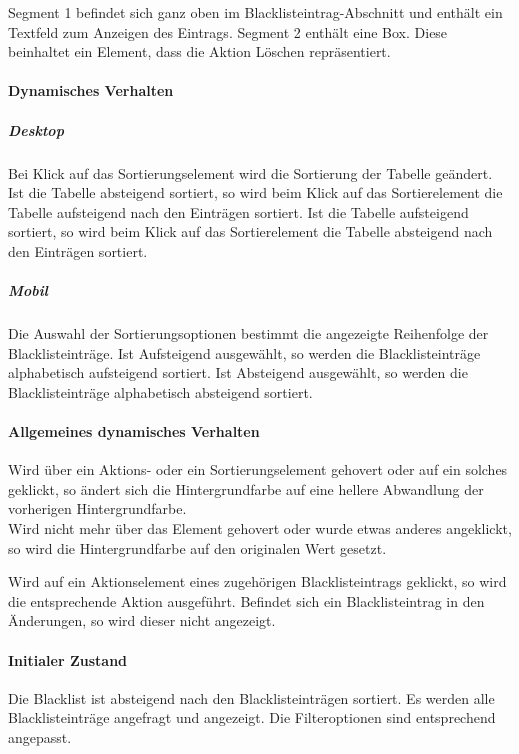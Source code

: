 Segment 1 befindet sich ganz oben im Blacklisteintrag-Abschnitt und enthält ein Textfeld zum Anzeigen des Eintrags.
Segment 2 enthält eine Box. Diese beinhaltet ein Element, dass die Aktion \dq Löschen \dq{} repräsentiert.

\paragraph*{Dynamisches Verhalten}
\subparagraph*{Desktop}
Bei Klick auf das Sortierungselement wird die Sortierung der Tabelle geändert.
Ist die Tabelle absteigend sortiert, so wird beim Klick auf das Sortierelement die Tabelle aufsteigend nach den Einträgen sortiert.
Ist die Tabelle aufsteigend sortiert, so wird beim Klick auf das Sortierelement die Tabelle absteigend nach den Einträgen sortiert.

\subparagraph*{Mobil}
Die Auswahl der Sortierungsoptionen bestimmt die angezeigte Reihenfolge der Blacklisteinträge.
Ist \dq Aufsteigend \dq{} ausgewählt, so werden die Blacklisteinträge alphabetisch aufsteigend sortiert.
Ist \dq Absteigend \dq{} ausgewählt, so werden die Blacklisteinträge alphabetisch absteigend sortiert.

\paragraph*{Allgemeines dynamisches Verhalten}
Wird über ein Aktions- oder ein Sortierungselement gehovert oder auf ein solches geklickt, so ändert sich die Hintergrundfarbe auf eine hellere Abwandlung der vorherigen Hintergrundfarbe. \\
Wird nicht mehr über das Element gehovert oder wurde etwas anderes angeklickt, so wird die Hintergrundfarbe auf den originalen Wert gesetzt.

Wird auf ein Aktionselement eines zugehörigen Blacklisteintrags geklickt, so wird die entsprechende Aktion ausgeführt.
Befindet sich ein Blacklisteintrag in den Änderungen, so wird dieser nicht angezeigt.

\paragraph*{Initialer Zustand}
Die Blacklist ist absteigend nach den Blacklisteinträgen sortiert.
Es werden alle Blacklisteinträge angefragt und angezeigt.
Die Filteroptionen sind entsprechend angepasst.